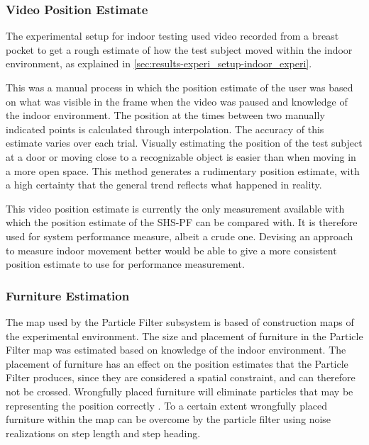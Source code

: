 \subsubsection{Video Position Estimate}
The experimental setup for indoor testing used video recorded from a breast pocket to get a rough estimate of how the test subject moved within the indoor environment, as explained in \cref{sec:results-experi_setup-indoor_experi}. \par 

This was a manual process in which the position estimate of the user was based on what was visible in the frame when the video was paused and knowledge of the indoor environment. The position at the times between two manually indicated points is calculated through interpolation. The accuracy of this estimate varies over each trial. Visually estimating the position of the test subject at a door or moving close to a recognizable object is easier than when moving in a more open space. This method generates a rudimentary position estimate, with a high certainty that the general trend reflects what happened in reality.  \par 

This video position estimate is currently the only measurement available with which the position estimate of the SHS-PF can be compared with. It is therefore used for system performance measure, albeit a crude one. Devising an approach to measure indoor movement better would be able to give a more consistent position estimate to use for performance measurement. \par 



\subsubsection{Furniture Estimation}
The map used by the Particle Filter subsystem is based of construction maps of the experimental environment. The size and placement of furniture in the Particle Filter map was estimated based on knowledge of the indoor environment. The placement of furniture has an effect on the position estimates that the Particle Filter produces, since they are considered a spatial constraint, and can therefore not be crossed. Wrongfully placed furniture will eliminate particles that may be representing the position correctly . To a certain extent wrongfully placed furniture within the map can be overcome by the particle filter using noise realizations on step length and step heading. \par 

